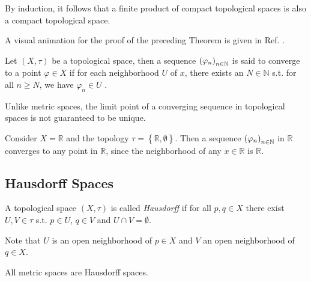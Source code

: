 \begin{corollary}
	By induction, it follows that a finite product of compact topological spaces is also a compact topological space.
\end{corollary}

\begin{remark}
	A visual animation for the proof of the preceding Theorem is given in Ref. \cite{5082194}.
\end{remark}

\begin{defn}
	Let $(X, \tau)$ be a topological space, then a sequence $\seq[\varphi_n]$ is said to converge to a point $\varphi\in X$ if for each neighborhood $U$ of $x$, there exists an $N\in\mathbb N$ s.t. for all $n\geq N$, we have $\varphi_n\in U$ \cite{289740}.
\end{defn}

\begin{remark}
	Unlike metric spaces, the limit point of a converging sequence in topological spaces is not guaranteed to be unique.
\end{remark}

\begin{exmp}
	Consider $X = \mathbb R$ and the topology $\tau = \left\{\mathbb R, \emptyset\right\}$. Then a sequence $\seq[\varphi_n]$ in $\mathbb R$ converges to any point in $\mathbb R$, since the neighborhood of any $x\in \mathbb R$ is $\mathbb R$.
\end{exmp}

\subsection{Hausdorff Spaces}

\begin{defn}[Hausdorff]
	A topological space $\left(X, \tau\right)$ is called \textit{Hausdorff} if for all $p, q\in X$ there exist $U, V\in \tau$ s.t. $p\in U$, $q\in V$ and $U\cap V = \emptyset$.  
\end{defn} 

\begin{remark}
	Note that $U$ is an open neighborhood of $p\in X$ and $V$ an open neighborhood of $q\in X$.
\end{remark}

\begin{theorem}
	All metric spaces are Hausdorff spaces. 
\end{theorem}

